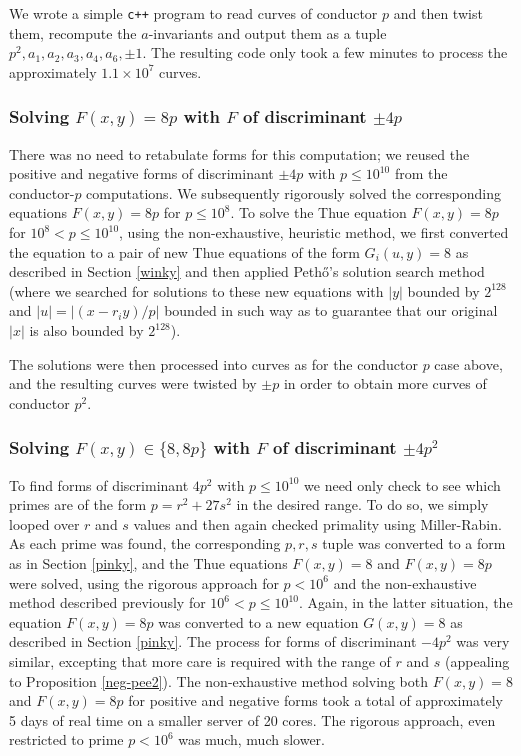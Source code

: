 We wrote a simple \texttt{c++} program to read curves of conductor $p$ and then twist 
them, recompute the $a$-invariants and output them as a tuple 
$p^2,a_1,a_2,a_3,a_4,a_6,\pm1$. The resulting code only took a few minutes to process the 
approximately $1.1\times10^7$ curves.

\subsubsection{Solving $F(x,y)=8p$ with $F$ of discriminant $\pm 4p$}
There was no need to retabulate forms for this computation; we reused the positive and negative forms of discriminant 
$\pm 4p$ with $p \leq 10^{10}$ from the conductor-$p$ computations. We subsequently rigorously solved the corresponding 
equations $F(x,y)=8p$ for $p \leq 10^8$. To solve the Thue equation $F(x,y)=8p$ for $10^8 < p \leq 10^{10}$, using the 
non-exhaustive, heuristic method, we first converted the equation to a pair of new Thue equations of the form 
$G_i(u,y)=8$ as described in Section \ref{winky} and then applied  Peth\H{o}'s solution search method (where we searched for solutions to these new equations with 
$|y|$ bounded by $2^{128}$ and $|u|=|(x-r_iy)/p|$ bounded in such way as to guarantee that our original $|x|$  is also bounded by $2^{128}$). 

The solutions were then processed into curves as for the conductor $p$ case 
above, and the resulting curves were twisted by $\pm p$ in order to obtain more 
curves of conductor $p^2$. 

\subsubsection{Solving $F(x,y) \in \{ 8, 8p \}$ with $F$ of  discriminant $\pm 4p^2$}
To find forms of discriminant $4 p^2$ with $p\leq 10^{10}$ we need only check to see which primes are of the form $p = r^2+27s^2$ in the desired range. To 
do so, we simply looped over $r$ and $s$ values and then again checked primality using 
Miller-Rabin. As each prime was found, the corresponding $p,r,s$ tuple was converted to a 
form  as in Section \ref{pinky}, and the Thue equations $F(x,y)=8$ and $F(x,y)=8p$ were solved,  using the rigorous
approach for $p < 10^6$ and  the 
non-exhaustive method described previously  for $10^6 < p \leq 10^{10}$. Again, in the latter situation, the equation $F(x,y)=8p$ was converted to a 
new equation $G(x,y)=8$ as described in Section \ref{pinky}. The process for forms of discriminant $-4p^2$ was very similar, 
excepting that more care is required with the range of $r$ and $s$ (appealing to Proposition \ref{neg-pee2}). The non-exhaustive 
method solving both $F(x,y)=8$ and $F(x,y)=8p$ for positive and negative forms took a total of 
approximately 5 days of real time on a smaller server of 20 cores. The rigorous approach, even restricted to prime $p < 10^6$ was much, much slower.

